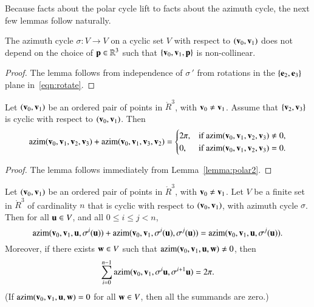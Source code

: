Because facts about the polar cycle lift to facts about the azimuth cycle,
the next few lemmas follow naturally.


\begin{lemma}[] The azimuth cycle $\sigma:V\to V$ on
  a cyclic set $V$ with respect to $({\mathbf v}_0,{\mathbf v}_1)$ does not depend on
  the choice of ${\mathbf p}\in\mathbb{R}^3$ such that $\{{\mathbf v}_0,{\mathbf v}_1,{\mathbf p}\}$ is
  non-collinear.
\end{lemma}
%
%

\begin{proof} The lemma follows from independence of $\sigma\,'$ from
rotations in the $\{{\mathbf e}_2,{\mathbf e}_3\}$ plane  in~\eqref{eqn:rotate}.
\end{proof}


\begin{lemma}[] 
Let $({\mathbf v}_0,{\mathbf v}_1)$ be an ordered pair of points in $\ring{R}^3$,
with ${\mathbf v}_0\ne {\mathbf v}_1$.  Assume that $\{{\mathbf v}_2,{\mathbf v}_3\}$ is cyclic
with respect to $({\mathbf v}_0,{\mathbf v}_1)$.  Then
\begin{displaymath}
{\operatorname{azim}}({\mathbf v}_0,{\mathbf v}_1,{\mathbf v}_2,{\mathbf v}_3) + {\operatorname{azim}}({\mathbf v}_0,{\mathbf v}_1,{\mathbf v}_3,{\mathbf v}_2) 
= \begin{cases} 2\pi, & \text{if }{\operatorname{azim}}({\mathbf v}_0,{\mathbf v}_1,{\mathbf v}_2,{\mathbf v}_3)\ne 0,\\
0, & \text{if }{\operatorname{azim}}({\mathbf v}_0,{\mathbf v}_1,{\mathbf v}_2,{\mathbf v}_3)=0.
\end{cases}
\end{displaymath}
\end{lemma}
%

\begin{proof} The lemma follows immediately from Lemma~\ref{lemma:polar2}.
\end{proof}

\begin{lemma}[] \label{lemma:2pi-sum}
Let $({\mathbf v}_0,{\mathbf v}_1)$ be an ordered pair of points in $\ring{R}^3$,
with ${\mathbf v}_0\ne {\mathbf v}_1$.  Let $V$ be a finite set in $\ring{R}^3$ of
cardinality $n$ that
is cyclic with respect to $({\mathbf v}_0,{\mathbf v}_1)$,
with azimuth cycle $\sigma$.
Then for all ${\mathbf u}\in V$,
and all $0\le i \le j < n$,
\begin{displaymath}
{\operatorname{azim}}({\mathbf v}_0,{\mathbf v}_1,{\mathbf u},\sigma^i({\mathbf u})) +
{\operatorname{azim}}({\mathbf v}_0,{\mathbf v}_1,\sigma^i({\mathbf u}),\sigma^j({\mathbf u})) =
{\operatorname{azim}}({\mathbf v}_0,{\mathbf v}_1,{\mathbf u},\sigma^j({\mathbf u})).
\end{displaymath}
Moreover, if there exists ${\mathbf w}\in V$ such that 
${\operatorname{azim}}({\mathbf v}_0,{\mathbf v}_1,{\mathbf u},{\mathbf w})\ne0$,
then
\begin{displaymath}
\sum_{i=0}^{n-1} {\operatorname{azim}}({\mathbf v}_0,{\mathbf v}_1,\sigma^i{\mathbf u},\sigma^{i+1}{\mathbf u}) = 2\pi.
\end{displaymath}
(If ${\operatorname{azim}}({\mathbf v}_0,{\mathbf v}_1,{\mathbf u},{\mathbf w})=0$ for all ${\mathbf w}\in V$, then all the
summands are zero.)
\end{lemma}
%
%
%
%
%

